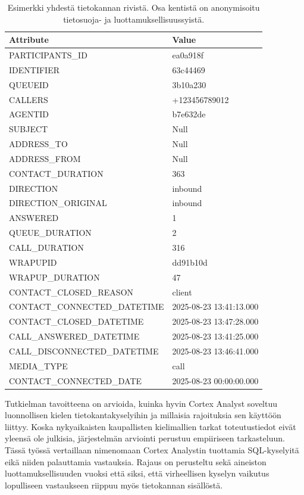\begin{table}[ht]
  \centering
  \small
  \begin{tabularx}{0.8\textwidth}{l X}
    \toprule
    \textbf{Attribute} & \textbf{Value} \\
    \midrule
    PARTICIPANTS\_ID & ea0a918f \\
    IDENTIFIER & 63c44469 \\
    QUEUEID & 3b10a230 \\
    CALLERS & +123456789012 \\
    AGENTID & b7e632de \\
    SUBJECT & Null \\
    ADDRESS\_TO & Null \\
    ADDRESS\_FROM & Null \\
    CONTACT\_DURATION & 363 \\
    DIRECTION & inbound \\
    DIRECTION\_ORIGINAL & inbound \\
    ANSWERED & 1 \\
    QUEUE\_DURATION & 2 \\
    CALL\_DURATION & 316 \\
    WRAPUPID & dd91b10d \\
    WRAPUP\_DURATION & 47 \\
    CONTACT\_CLOSED\_REASON & client \\
    CONTACT\_CONNECTED\_DATETIME & 2025-08-23 13:41:13.000 \\
    CONTACT\_CLOSED\_DATETIME & 2025-08-23 13:47:28.000 \\
    CALL\_ANSWERED\_DATETIME & 2025-08-23 13:41:25.000 \\
    CALL\_DISCONNECTED\_DATETIME & 2025-08-23 13:46:41.000 \\
    MEDIA\_TYPE & call \\
    CONTACT\_CONNECTED\_DATE & 2025-08-23 00:00:00.000 \\
    \bottomrule
  \end{tabularx}
  \caption{Esimerkki yhdestä tietokannan rivistä. Osa kentistä on anonymisoitu tietosuoja- ja luottamuksellisuussyistä.}
  \label{tb:example_record}
\end{table}

Tutkielman tavoitteena on arvioida, kuinka hyvin Cortex Analyst soveltuu luonnollisen kielen tietokantakyselyihin ja millaisia rajoituksia sen käyttöön liittyy. Koska nykyaikaisten kaupallisten kielimallien tarkat toteutustiedot eivät yleensä ole julkisia, järjestelmän arviointi perustuu empiiriseen tarkasteluun. Tässä työssä vertaillaan nimenomaan Cortex Analystin tuottamia SQL-kyselyitä eikä niiden palauttamia vastauksia. Rajaus on perusteltu sekä aineiston luottamuksellisuuden vuoksi että siksi, että virheellisen kyselyn vaikutus lopulliseen vastaukseen riippuu myös tietokannan sisällöstä.

